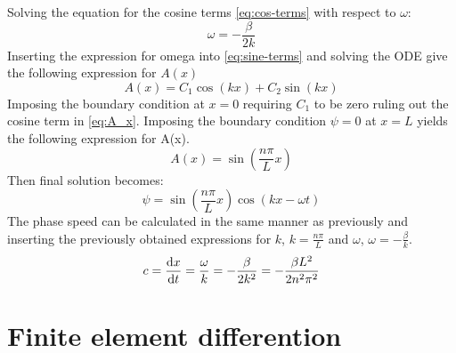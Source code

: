 Solving the equation for the cosine terms \cref{eq:cos-terms} with respect to
$\omega$:
\begin{equation}
    \omega = -\frac{\beta}{2k}
\end{equation}
Inserting the expression for omega into \cref{eq:sine-terms} and solving the ODE
give the following expression for $A(x)$
\begin{equation}\label{eq:A_x}
    A(x) = C_1 \cos{(kx) + C_2 \sin{(kx)}}
\end{equation}
Imposing the boundary condition at $x=0$ requiring $C_1$ to be zero ruling
out the cosine term in \cref{eq:A_x}. Imposing the boundary condition $\psi=0$
at $x=L$ yields the following expression for A(x).
\begin{equation}
    A(x) = \sin{\left(\frac{n\pi}{L} x \right)}
\end{equation}
Then final solution becomes:
\begin{equation}
    \psi = \sin{\left(\frac{n\pi}{L} x \right)} \cos{(kx - \omega t)}
\end{equation}    
The phase speed can be calculated in the same manner as previously and inserting
the previously obtained expressions for $k$, $k=\frac{n\pi}{L}$ and $\omega$,
$\omega = -\frac{\beta}{k}$.
\begin{equation}
    c = \dv{x}{t} = \frac{\omega}{k} = -\frac{\beta}{2k^2} = -\frac{\beta L^2}{2 n^2 \pi^2}
\end{equation}

\section{Finite element differention}